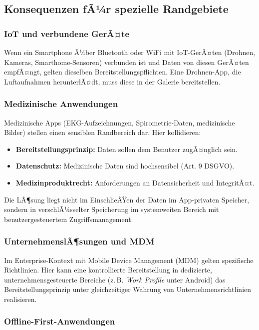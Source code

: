 ﻿\documentclass[12pt, a4paper]{article}
\begin{document}
\subsection{Konsequenzen fÃ¼r spezielle Randgebiete}

\subsubsection{IoT und verbundene GerÃ¤te}

Wenn ein Smartphone Ã¼ber Bluetooth oder WiFi mit IoT-GerÃ¤ten (Drohnen, Kameras,
Smarthome-Sensoren) verbunden ist und Daten von diesen GerÃ¤ten empfÃ¤ngt, gelten
dieselben Bereitstellungspflichten. Eine Drohnen-App, die Luftaufnahmen herunterlÃ¤dt,
muss diese in der Galerie bereitstellen.

\subsubsection{Medizinische Anwendungen}

Medizinische Apps (EKG-Aufzeichnungen, Spirometrie-Daten, medizinische Bilder)
stellen einen sensiblen Randbereich dar. Hier kollidieren:
\begin{itemize}[leftmargin=*]
  \item \textbf{Bereitstellungsprinzip:} Daten sollen dem Benutzer zugÃ¤nglich sein.
  \item \textbf{Datenschutz:} Medizinische Daten sind hochsensibel (Art. 9 DSGVO).
  \item \textbf{Medizinproduktrecht:} Anforderungen an Datensicherheit und IntegritÃ¤t.
\end{itemize}

Die LÃ¶sung liegt nicht im EinschlieÃŸen der Daten im App-privaten Speicher, sondern
in verschlÃ¼sselter Speicherung im systemweiten Bereich mit benutzergesteuertem
Zugriffsmanagement.

\subsubsection{UnternehmenslÃ¶sungen und MDM}

Im Enterprise-Kontext mit Mobile Device Management (MDM) gelten spezifische
Richtlinien. Hier kann eine kontrollierte Bereitstellung in dedizierte,
unternehmensgesteuerte Bereiche (z.\,B. \emph{Work Profile} unter Android)
das Bereitstellungsprinzip unter gleichzeitiger Wahrung von Unternehmensrichtlinien
realisieren.

\subsubsection{Offline-First-Anwendungen}
\end{document}
